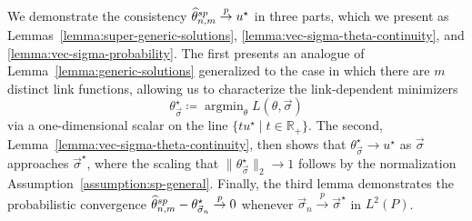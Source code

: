 \documentclass[11pt]{article}
\newcommand{\R}{\mathbb{R}} %
\newcommand{\what}[1]{\widehat{#1}}
\newcommand{\sem}{^{\textup{sp}}}
\newcommand{\norms}[1]{\|{#1}\|} %
\newcommand{\ltwos}[1]{\norms{#1}_2} %
\newcommand{\<}{\langle} %
\renewcommand{\>}{\rangle}
\DeclareMathOperator*{\argmin}{argmin}
\newcommand{\cp}{\stackrel{p}{\rightarrow}}
\newcommand{\defeq}{\coloneqq}
\newcommand{\opt}{^\star}
\newcommand{\spe}{\what{\theta}\sem_{n,m}} %
\begin{document}
We demonstrate the consistency $\spe \cp u\opt$ in three parts, which we
present as Lemmas~\ref{lemma:super-generic-solutions},
\ref{lemma:vec-sigma-theta-continuity}, and
\ref{lemma:vec-sigma-probability}. The first presents an analogue of
Lemma~\ref{lemma:generic-solutions} generalized to the case in
which there are $m$ distinct link functions, allowing us to characterize
the link-dependent minimizers
\begin{equation*}
  \theta\opt_{\vec{\sigma}} \defeq \argmin_\theta L(\theta, \vec{\sigma})
\end{equation*}
via a one-dimensional scalar on the line $\{t u\opt \mid t \in \R_+\}$.  The
second, Lemma~\ref{lemma:vec-sigma-theta-continuity}, then shows that
$\theta\opt_{\vec{\sigma}} \to u\opt$ as $\vec{\sigma}$ approaches
$\vec{\sigma}\opt$, where the scaling that
$\ltwos{\theta\opt_{\vec{\sigma}}} \to 1$ follows by the normalization
Assumption~\ref{assumption:sp-general}.
Finally, the third lemma
demonstrates the probabilistic convergence $\spe -
\theta\opt_{\vec{\sigma}_n} \cp 0$ whenever $\vec{\sigma}_n \cp
\vec{\sigma}\opt$ in $L^2(P)$.
\end{document}
